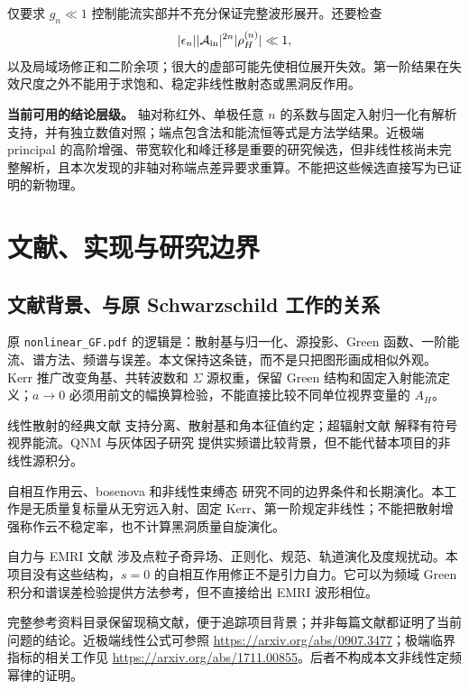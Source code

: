 \documentclass[UTF8,fontset=fandol,12pt,a4paper,oneside,openany]{ctexrep}
\begin{document}
仅要求 $g_n\ll1$ 控制能流实部并不充分保证完整波形展开。还要检查
\begin{equation}
|\epsilon_n||\mathcal A_{\rm in}|^{2n}|\rho_H^{(n)}|\ll1,
\end{equation}
以及局域场修正和二阶余项；很大的虚部可能先使相位展开失效。第一阶结果在失效尺度之外不能用于求饱和、稳定非线性散射态或黑洞反作用。

\begin{note}
\textbf{当前可用的结论层级。} 轴对称红外、单极任意 $n$ 的系数与固定入射归一化有解析支持，并有独立数值对照；端点包含法和能流恒等式是方法学结果。近极端 principal 的高阶增强、带宽软化和峰迁移是重要的研究候选，但非线性核尚未完整解析，且本次发现的非轴对称端点差异要求重算。不能把这些候选直接写为已证明的新物理。
\end{note}

\chapter{文献、实现与研究边界}
\section{文献背景、与原 Schwarzschild 工作的关系}
原 \texttt{nonlinear\_GF.pdf} 的逻辑是：散射基与归一化、源投影、Green 函数、一阶能流、谱方法、频谱与误差。本文保持这条链，而不是只把图形画成相似外观。Kerr 推广改变角基、共转波数和 $\Sigma$ 源权重，保留 Green 结构和固定入射能流定义；$a\to0$ 必须用前文的幅换算检验，不能直接比较不同单位视界变量的 $A_H$。

线性散射的经典文献\cite{Sanchez1976,Futterman,GlampedakisAndersson2001,Teukolsky1973} 支持分离、散射基和角本征值约定；超辐射文献\cite{PressTeukolsky,StarobinskyChurilov} 解释有符号视界能流。QNM 与灰体因子研究\cite{Berti2009,Oshita2023,Oshita2024} 提供实频谱比较背景，但不能代替本项目的非线性源积分。

自相互作用云、bosenova 和非线性束缚态\cite{YoshinoKodama2012,HerdeiroQCloud2014,Baryakhtar2021} 研究不同的边界条件和长期演化。本工作是无质量复标量从无穷远入射、固定 Kerr、第一阶规定非线性；不能把散射增强称作云不稳定率，也不计算黑洞质量自旋演化。

自力与 EMRI 文献\cite{BarackPound2019,PoundWardell2021} 涉及点粒子奇异场、正则化、规范、轨道演化及度规扰动。本项目没有这些结构，$s=0$ 的自相互作用修正不是引力自力。它可以为频域 Green 积分和谱误差检验提供方法参考，但不直接给出 EMRI 波形相位。

完整参考资料目录保留现稿文献，便于追踪项目背景；并非每篇文献都证明了当前问题的结论。近极端线性公式可参照 \url{https://arxiv.org/abs/0907.3477}；极端临界指标的相关工作见 \url{https://arxiv.org/abs/1711.00855}。后者不构成本文非线性定频幂律的证明。
\end{document}
